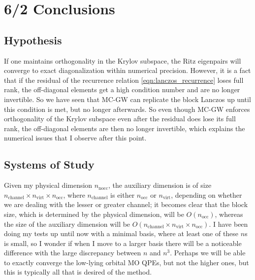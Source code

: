 \section{6/2 Conclusions}
\subsection{Hypothesis}
If one maintains orthogonality in the Krylov subspace, the Ritz eigenpairs will converge to exact diagonalization within numerical precision. However, it is a fact that if the residual of the recurrence relation \ref{eqn:lanczos_recurrence} loses full rank, the off-diagonal elements get a high condition number and are no longer invertible. So we have seen that MC-GW can replicate the block Lanczos up until this condition is met, but no longer afterwards. So even though MC-GW enforces orthogonality of the Krylov subspace even after the residual does lose its full rank, the off-diagonal elements are then no longer invertible, which explains the numerical issues that I observe after this point.
\subsection{Systems of Study}
Given my physical dimension $n_\text{nocc}$, the auxiliary dimension is of size $n_\text{channel} \times n_\text{virt} \times n_\text{occ}$, where $n_\text{channel}$ is either $n_\text{occ}$ or $n_\text{virt}$, depending on whether we are dealing with the lesser or greater channel; it becomes clear that the block size, which is determined by the physical dimension, will be $O(n_\text{occ})$, whereas the size of the auxiliary dimension will be $O(n_\text{channel} \times n_\text{virt} \times n_\text{occ})$. I have been doing my tests up until now with a minimal basis, where at least one of these $n$s is small, so I wonder if when I move to a larger basis there will be a noticeable difference with the large discrepancy between $n$ and $n^3$. Perhaps we will be able to exactly converge the low-lying orbital MO QPEs, but not the higher ones, but this is typically all that is desired of the method. 
